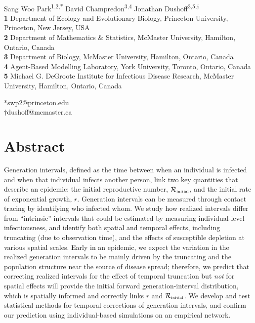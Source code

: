 \documentclass[12pt]{article}
\date{\today}
\newcommand{\Rx}[1]{\ensuremath{{\mathcal R}_{#1}}\xspace}
\newcommand{\Rini}{\Rx{\textrm{\tiny initial}}}
\begin{document}
\begin{flushleft}{
	\Large
	\textbf{}
}
\newline
\\
Sang Woo Park\textsuperscript{1,2,*}
David Champredon\textsuperscript{3,4}
Jonathan Dushoff\textsuperscript{3,5,$\dagger$}
\\

\bigskip
\textbf{1} Department of Ecology and Evolutionary Biology, Princeton University, Princeton, New Jersey, USA
\\
\textbf{2} Department of Mathematics \& Statistics, McMaster University, Hamilton, Ontario, Canada
\\
\textbf{3} Department of Biology, McMaster University, Hamilton, Ontario, Canada
\\
\textbf{4} Agent-Based Modelling Laboratory, York University, Toronto, Ontario, Canada
\\
\textbf{5} Michael G. DeGroote Institute for Infectious Disease Research, McMaster University, Hamilton, Ontario, Canada
\\
\bigskip

*swp2@princeton.edu\\
$\dagger$dushoff@mcmaster.ca
\end{flushleft} 

\section*{Abstract}

Generation intervals, defined as the time between when an individual is infected and when that individual infects another person, link two key quantities that describe an epidemic: the initial reproductive number, $\Rini$, and the initial rate of exponential growth, $r$.
Generation intervals can be measured through contact tracing by identifying who infected whom.
We study how realized intervals differ from ``intrinsic'' intervals that could be estimated by measuring individual-level infectiousness, and identify both spatial and temporal effects, including truncating (due to observation time), and the effects of susceptible depletion at various spatial scales.
Early in an epidemic, we expect the variation in the realized generation intervals to be mainly driven by the truncating and the population structure near the source of disease spread; 
therefore, we predict that correcting realized intervals for the effect of temporal truncation but \emph{not} for spatial effects will provide the initial forward generation-interval distribution, which is spatially informed and correctly links $r$ and $\Rini$.
We develop and test statistical methods for temporal corrections of generation intervals,
and confirm our prediction using individual-based simulations on an empirical network.
\end{document}
